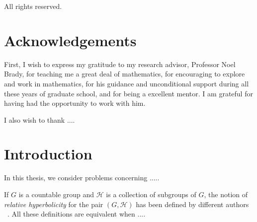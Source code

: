 \documentclass[12pt]{report}
\theoremstyle{definition}
\theoremstyle{remark}
\numberwithin{equation}{chapter}
\numberwithin{figure}{chapter}
\begin{document}
{{\begin{center}
All rights reserved.
\end{center}
}



\chapter*{Acknowledgements}

First, I wish to express my gratitude to my research advisor, Professor Noel Brady, for teaching me a great deal of mathematics,
for encouraging to explore and work in mathematics,  for his guidance and unconditional support during all these years of graduate school,
and for being a excellent mentor.  I am grateful for having had the opportunity to work with him.

I also wish to thank ....


{\singlespacing
\tableofcontents
}
\newpage

} %




\chapter{Introduction}

In this thesis, we consider problems concerning .....

If $G$ is a countable group and $\mathcal{H}$ is a collection of subgroups of $G$, the notion of \emph{relative hyperbolicity} for the pair $(G, \mathcal{H})$  has been defined by
different authors ~\cite{BO99, DS05, Fa98, Gr87, GM06, HK08, Os06, Ya99}.  All these definitions are equivalent when ....
\end{document}
